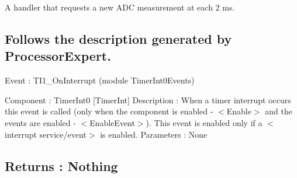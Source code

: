 A handler that requests a new A\+DC measurement at each 2 ms. 

\subsection*{Follows the description generated by Processor\+Expert. }

Event \+: T\+I1\+\_\+\+On\+Interrupt (module Timer\+Int0\+Events)

Component \+: Timer\+Int0 \mbox{[}Timer\+Int\mbox{]} Description \+: When a timer interrupt occurs this event is called (only when the component is enabled -\/ $<$\+Enable$>$ and the events are enabled -\/ $<$\+Enable\+Event$>$). This event is enabled only if a $<$interrupt service/event$>$ is enabled. Parameters \+: None \subsection*{Returns \+: Nothing }